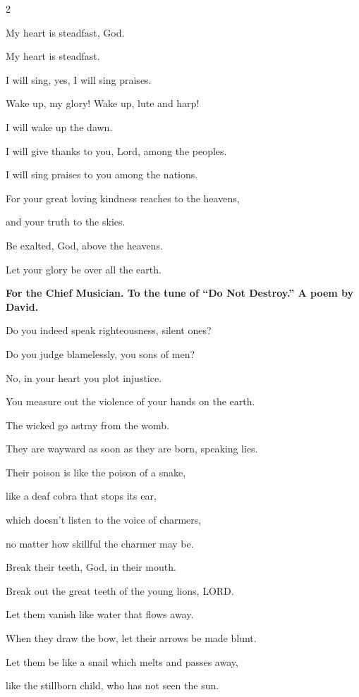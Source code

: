 \begin{multicols}{2}
	
	
	\myverse{}My heart is steadfast, God.
	
	My heart is steadfast.
	
	I will sing, yes, I will sing praises.
	
	
	\myverse{}Wake up, my glory! Wake up, lute and harp!
	
	I will wake up the dawn.
	
	
	\myverse{}I will give thanks to you, Lord, among the peoples.
	
	I will sing praises to you among the nations.
	
	
	\myverse{}For your great loving kindness reaches to the heavens,
	
	and your truth to the skies.
	
	
	\myverse{}Be exalted, God, above the heavens.
	
	Let your glory be over all the earth.
	
	
	\mychapter{}\textbf{For the Chief Musician. To the tune of “Do Not Destroy.” A poem by David.}
	
	\myverse*{}Do you indeed speak righteousness, silent ones?
	
	Do you judge blamelessly, you sons of men?
	
	
	\myverse{}No, in your heart you plot injustice.
	
	You measure out the violence of your hands on the earth.
	
	
	\myverse{}The wicked go astray from the womb.
	
	They are wayward as soon as they are born, speaking lies.
	
	
	\myverse{}Their poison is like the poison of a snake,
	
	like a deaf cobra that stops its ear,
	
	
	\myverse{}which doesn’t listen to the voice of charmers,
	
	no matter how skillful the charmer may be.
	
	
	\myverse{}Break their teeth, God, in their mouth.
	
	Break out the great teeth of the young lions, LORD.
	
	
	\myverse{}Let them vanish like water that flows away.
	
	When they draw the bow, let their arrows be made blunt.
	
	
	\myverse{}Let them be like a snail which melts and passes away,
	
	like the stillborn child, who has not seen the sun.
	

\end{multicols}
